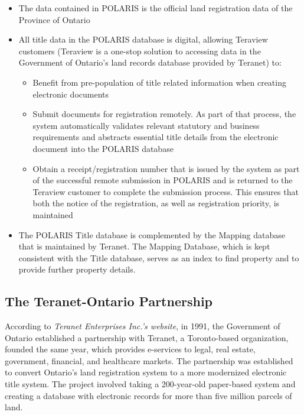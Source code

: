 \begin{itemize}
    \item The data contained in POLARIS is the official land registration data of the Province of Ontario
    \item All title data in the POLARIS database is digital, allowing Teraview customers (Teraview is a one-stop solution to accessing data in the Government of Ontario's land records database provided by Teranet) to:
    \begin{itemize}
        \item Benefit from pre-population of title related information when creating electronic documents
        \item Submit documents for registration remotely.
        As part of that process, the system automatically validates relevant statutory and business requirements and abstracts essential title details from the electronic document into the POLARIS database
        \item Obtain a receipt/registration number that is issued by the system as part of the successful remote submission in POLARIS and is returned to the Teraview customer to complete the submission process.
        This ensures that both the notice of the registration, as well as registration priority, is maintained
    \end{itemize}
    \item The POLARIS Title database is complemented by the Mapping database that is maintained by Teranet.
    The Mapping Database, which is kept consistent with the Title database, serves as an index to find property and to provide further property details.
\end{itemize}

\subsection{The Teranet-Ontario Partnership} \label{subsec:teranet_ontario}

According to \textit{Teranet Enterprises Inc.'s website}\cite{TeranetEnterprisesInc.2019}, in 1991, the Government of Ontario established a partnership with Teranet, a Toronto-based organization, founded the same year, which provides e-services to legal, real estate, government, financial, and healthcare markets.
The partnership was established to convert Ontario's land registration system to a more modernized electronic title system.
The project involved taking a 200-year-old paper-based system and creating a database with electronic records for more than five million parcels of land.

